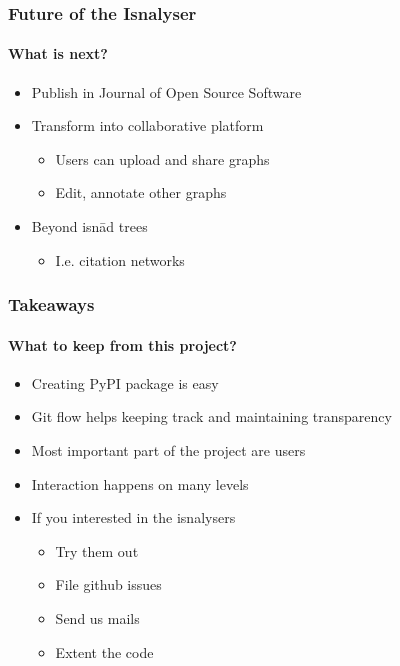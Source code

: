 \documentclass[9pt]{beamer}
\begin{document}
\begin{frame}
\frametitle{Future of the Isnalyser}
\framesubtitle{What is next?}
\begin{itemize}
	\item Publish in Journal of Open Source Software
	\pause
	\item Transform into collaborative platform
	\begin{itemize}
		\item Users can upload and share graphs
		\item Edit, annotate other graphs
	\end{itemize}
\pause
	\item Beyond isnād trees
	\begin{itemize}
		\item I.e. citation networks
	\end{itemize}
\end{itemize}
\end{frame}






\begin{frame}
\frametitle{Takeaways}
\framesubtitle{What to keep from this project?}
\begin{itemize}%
	\item Creating PyPI package is easy
	\pause
	\item Git flow helps keeping track and maintaining transparency
	\pause
	\item Most important part of the project are users
	\item Interaction happens on many levels
	\pause
	\item If you interested in the isnalysers
	\begin{itemize}
		\item Try them out
		\item File github issues
		\item Send us mails
		\item Extent the code
	\end{itemize}
\end{itemize}
\end{frame} 
\end{document}
